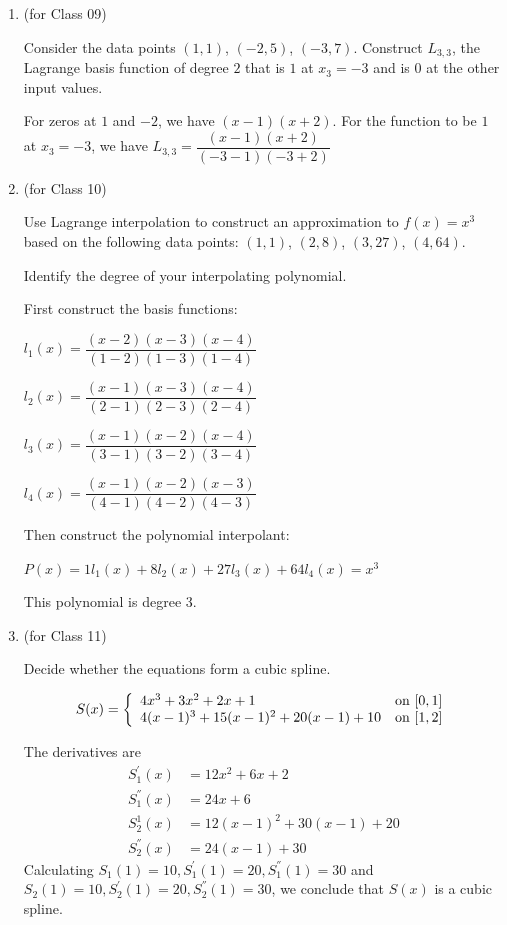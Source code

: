 \documentclass[12pt,letterpaper,answers]{exam}
\begin{document}
\begin{enumerate}
\item (for Class 09)

Consider the data points $(1,1)$, $(-2, 5)$, $(-3, 7)$.  Construct $L_{3,3}$, the Lagrange basis function of degree $2$ that is $1$ at $x_3 = -3$ and is $0$ at the other input values.

\begin{solution}
For zeros at $1$ and $-2$, we have $(x-1)(x+2)$.  For the function to be $1$ at $x_3 = -3$, we have $L_{3,3} = \dfrac{(x-1)(x+2)}{(-3-1)(-3+2)}$

\end{solution}


\item (for Class 10)

Use Lagrange interpolation to construct an approximation to $f(x) = x^3$ based on the following data points: $(1,1)$, $(2,8)$, $(3,27)$, $(4,64)$.

Identify the degree of your interpolating polynomial.

\begin{solution}
First construct the basis functions:

$l_1(x) = \dfrac{(x-2)(x-3)(x-4)}{(1-2)(1-3)(1-4)}$

$l_2(x) = \dfrac{(x-1)(x-3)(x-4)}{(2-1)(2-3)(2-4)}$

$l_3(x) = \dfrac{(x-1)(x-2)(x-4)}{(3-1)(3-2)(3-4)}$

$l_4(x) = \dfrac{(x-1)(x-2)(x-3)}{(4-1)(4-2)(4-3)}$

Then construct the polynomial interpolant:

$P(x) = 1l_1(x) + 8l_2(x) + 27l_3(x) + 64l_4(x)=x^3$

This polynomial is degree $3$.

\end{solution}


\item (for Class 11)

Decide whether the equations form a cubic spline.

\[S(x) = \left\{\begin{array}{l l}
4x^3 + 3x^2 + 2x + 1 & \text{on }[0,1] \\
4(x-1)^3 + 15(x-1)^2 + 20(x-1) + 10 & \text{on }[1,2] \\
\end{array}\right.\]

\begin{solution} The derivatives are
\begin{equation*}
\begin{aligned}
    S_1^{'}(x) &= 12x^2 + 6x + 2 \\
    S_1^{''}(x) &= 24x + 6 \\
    S_2^{1}(x) &= 12(x-1)^2 + 30(x-1) + 20 \\
    S_2^{''}(x) &= 24(x-1) + 30
\end{aligned}
\end{equation*}
Calculating $S_1(1)=10, S_1^{'}(1)=20, S_1^{''}(1)=30$ and $S_2(1)=10, S_2^{'}(1)=20, S_2^{''}(1)=30$, we conclude that $S(x)$ is a cubic spline.
\end{solution}


\end{enumerate}
\end{document}
